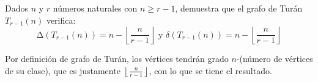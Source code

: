 \documentclass[twoside]{article}
\begin{document}
\begin{ejercicio}{2.4}

Dados $n$ y $r$ números naturales con $n ≥ r − 1$, demuestra que el grafo de Turán $T_{r−1}(n)$
verifica:
\[
∆(T_{r−1}(n)) = n − \left\lfloor\frac{ n}
{r − 1}
\right\rfloor \text{ y } δ(T_{r−1}(n)) = n − \left\lfloor \frac{n}
{r − 1}\right\rfloor
\]

\end{ejercicio}
\begin{solucion}
Por definición de grafo de Turán, los vértices tendrán grado $n$-(número de vértices de su clase), que es justamente $\left\lfloor\frac{n}{r − 1}\right\rfloor$, con lo que se tiene el resultado. 


\end{solucion}

\newpage
\end{document}
